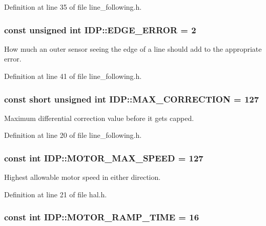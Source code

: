 Definition at line 35 of file line\_\-following.h.

\hypertarget{namespaceIDP_afa01378acc238f4bd41d8eb304f7afd7}{
\subsubsection[{EDGE\_\-ERROR}]{\setlength{\rightskip}{0pt plus 5cm}const unsigned int {\bf IDP::EDGE\_\-ERROR} = 2}}
\label{namespaceIDP_afa01378acc238f4bd41d8eb304f7afd7}


How much an outer sensor seeing the edge of a line should add to the appropriate error. 



Definition at line 41 of file line\_\-following.h.

\hypertarget{namespaceIDP_a246919caaacabcb0399802d542d8330b}{
\subsubsection[{MAX\_\-CORRECTION}]{\setlength{\rightskip}{0pt plus 5cm}const short unsigned int {\bf IDP::MAX\_\-CORRECTION} = 127}}
\label{namespaceIDP_a246919caaacabcb0399802d542d8330b}


Maximum differential correction value before it gets capped. 



Definition at line 20 of file line\_\-following.h.

\hypertarget{namespaceIDP_a4ead0b21ad2c507b542445695182d4cd}{
\subsubsection[{MOTOR\_\-MAX\_\-SPEED}]{\setlength{\rightskip}{0pt plus 5cm}const int {\bf IDP::MOTOR\_\-MAX\_\-SPEED} = 127}}
\label{namespaceIDP_a4ead0b21ad2c507b542445695182d4cd}


Highest allowable motor speed in either direction. 



Definition at line 21 of file hal.h.

\hypertarget{namespaceIDP_ab3a00a6cc8a6dba271e38d337daf4703}{
\subsubsection[{MOTOR\_\-RAMP\_\-TIME}]{\setlength{\rightskip}{0pt plus 5cm}const int {\bf IDP::MOTOR\_\-RAMP\_\-TIME} = 16}}
\label{namespaceIDP_ab3a00a6cc8a6dba271e38d337daf4703}



